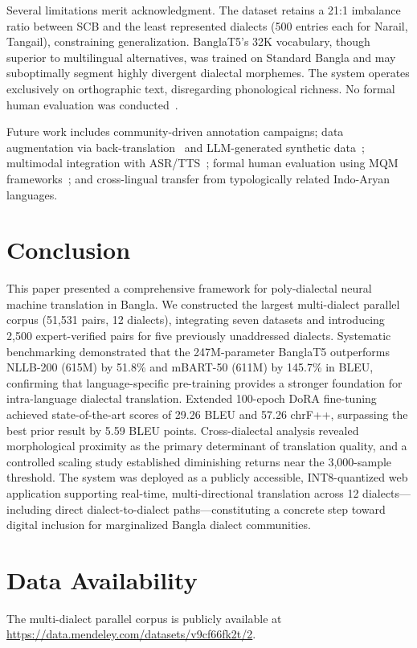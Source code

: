 \documentclass[conference]{IEEEtran}
\begin{document}
Several limitations merit acknowledgment. The dataset retains a 21:1 imbalance ratio between SCB and the least represented dialects (500 entries each for Narail, Tangail), constraining generalization. BanglaT5's 32K vocabulary, though superior to multilingual alternatives, was trained on Standard Bangla and may suboptimally segment highly divergent dialectal morphemes. The system operates exclusively on orthographic text, disregarding phonological richness. No formal human evaluation was conducted~\cite{mathur-etal-2020-tangled}.

Future work includes community-driven annotation campaigns; data augmentation via back-translation~\cite{sennrich-etal-2016-improving} and LLM-generated synthetic data~\cite{brown2020language}; multimodal integration with ASR/TTS~\cite{radford2023robust}; formal human evaluation using MQM frameworks~\cite{burchardt-2013-multidimensional}; and cross-lingual transfer from typologically related Indo-Aryan languages.

\section{Conclusion}

This paper presented a comprehensive framework for poly-dialectal neural machine translation in Bangla. We constructed the largest multi-dialect parallel corpus (51,531 pairs, 12 dialects), integrating seven datasets and introducing 2,500 expert-verified pairs for five previously unaddressed dialects. Systematic benchmarking demonstrated that the 247M-parameter BanglaT5 outperforms NLLB-200 (615M) by 51.8\% and mBART-50 (611M) by 145.7\% in BLEU, confirming that language-specific pre-training provides a stronger foundation for intra-language dialectal translation. Extended 100-epoch DoRA fine-tuning achieved state-of-the-art scores of 29.26 BLEU and 57.26 chrF++, surpassing the best prior result by 5.59 BLEU points. Cross-dialectal analysis revealed morphological proximity as the primary determinant of translation quality, and a controlled scaling study established diminishing returns near the 3,000-sample threshold. The system was deployed as a publicly accessible, INT8-quantized web application supporting real-time, multi-directional translation across 12 dialects---including direct dialect-to-dialect paths---constituting a concrete step toward digital inclusion for marginalized Bangla dialect communities.

\section*{Data Availability}
The multi-dialect parallel corpus is publicly available at \url{https://data.mendeley.com/datasets/v9cf66fk2t/2}.



\end{document}
